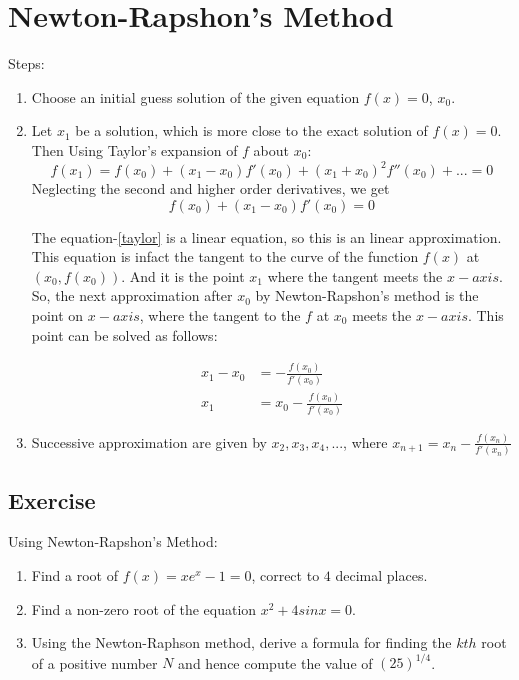 \documentclass[aima203_lecturenotes_ku.tex]{subfiles}
\begin{document}
\section{Newton-Rapshon's Method}
Steps:
\begin{enumerate}
\item Choose an initial guess solution of the given equation \(f(x)=0\), \(x_0\).

\item Let \(x_1\) be a solution, which is more close to the exact solution of \(f(x)=0\). Then Using Taylor's expansion of \(f\) about \(x_0\): \[f(x_1)=f(x_0) + (x_1-x_0)f'(x_0) + (x_1+x_0)^2f''(x_0) + ... = 0\]
  Neglecting the second and higher order derivatives, we get
  \begin{equation}
    \label{taylor}
  f(x_0) + (x_1-x_0)f'(x_0)=0
  \end{equation}
  \begin{footnotesize}
    The equation-\ref{taylor} is a linear equation, so this is an linear approximation. This equation is infact the tangent to the curve of the function \(f(x)\) at $(x_0, f(x_0))$. And it is the point $x_1$ where the tangent meets the $x-axis$. So, the next approximation after $x_0$ by Newton-Rapshon's method is the point on $x-axis$, where the tangent to the $f$ at $x_0$ meets the $x-axis$. This point can be solved as follows:
   \end{footnotesize}
  \begin{align*}
    x_1-x_0 & = - \frac{f(x_0)}{f'(x_0)} \\
    x_1 &= x_0 - \frac{f(x_0)}{f'(x_0)}
  \end{align*}

\item Successive approximation are given by \(x_2, x_3, x_4, ...\), where
  \(\displaystyle x_{n+1} = x_n - \frac{f(x_n)}{f'(x_n)}\)
\end{enumerate}

\subsection{Exercise}
Using Newton-Rapshon's Method:
\begin{enumerate}
\item Find a root of \(f(x)=xe^x-1=0\), correct to \(4\) decimal places.
\item Find a non-zero root of the equation $x^2 + 4sinx = 0$.
\item Using the Newton-Raphson method, derive a formula for finding the $kth$ root of a positive number $N$ and hence compute the value of $(25)^{1/4}$.

\end{enumerate}
\end{document}
